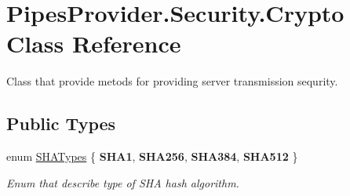 \hypertarget{class_pipes_provider_1_1_security_1_1_crypto}{}\section{Pipes\+Provider.\+Security.\+Crypto Class Reference}
\label{class_pipes_provider_1_1_security_1_1_crypto}


Class that provide metods for providing server transmission sequrity.  


\subsection*{Public Types}
\begin{DoxyCompactItemize}
\item 
enum \mbox{\hyperlink{class_pipes_provider_1_1_security_1_1_crypto_a6956e9aac98864917946b750dee3596e}{S\+H\+A\+Types}} \{ {\bfseries S\+H\+A1}, 
{\bfseries S\+H\+A256}, 
{\bfseries S\+H\+A384}, 
{\bfseries S\+H\+A512}
 \}
\begin{DoxyCompactList}\small\item\em Enum that describe type of S\+HA hash algorithm. \end{DoxyCompactList}\end{DoxyCompactItemize}
